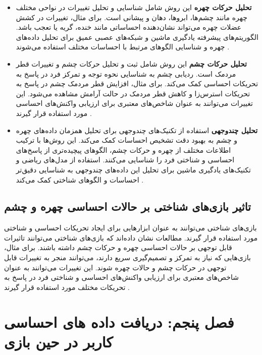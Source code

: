 \documentclass[12pt]{article}
\begin{document}
\begin{itemize}

\item \textbf{تحلیل حرکات چهره}  این روش شامل شناسایی و تحلیل تغییرات در نواحی مختلف چهره مانند چشم‌ها، ابروها، دهان و پیشانی است. برای مثال، تغییرات در کشش عضلات چهره می‌تواند نشان‌دهنده احساساتی مانند خنده، گریه یا تعجب باشد. الگوریتم‌های پیشرفته یادگیری ماشین و شبکه‌های عصبی عمیق برای تحلیل داده‌های چهره و شناسایی الگوهای مرتبط با احساسات مختلف استفاده می‌شوند \cite{Nweke2019}.

\item \textbf{تحلیل حرکات چشم}  این روش شامل ثبت و تحلیل حرکات چشم و تغییرات قطر مردمک است. ردیابی چشم به شناسایی نحوه توجه و تمرکز فرد در پاسخ به تحریکات احساسی کمک می‌کند. برای مثال، افزایش قطر مردمک چشم در پاسخ به تحریکات استرس‌زا و کاهش قطر مردمک در حالت آرامش مشاهده می‌شود. این تغییرات می‌توانند به عنوان شاخص‌های معتبری برای ارزیابی واکنش‌های احساسی مورد استفاده قرار گیرند \cite{Partala2003}.

\item \textbf{تحلیل چندوجهی}  استفاده از تکنیک‌های چندوجهی برای تحلیل همزمان داده‌های چهره و چشم به بهبود دقت تشخیص احساسات کمک می‌کند. این روش‌ها با ترکیب اطلاعات مختلف از چهره و حرکات چشم، الگوهای پیچیده‌تری از پاسخ‌های احساسی و شناختی فرد را شناسایی می‌کنند. استفاده از مدل‌های ریاضی و تکنیک‌های یادگیری ماشین برای تحلیل این داده‌های چندوجهی به شناسایی دقیق‌تر احساسات و الگوهای شناختی کمک می‌کند \cite{Zhao2019}.
\end{itemize}

\subsection{تاثیر بازی‌های شناختی بر حالات احساسی چهره و چشم}

بازی‌های شناختی می‌توانند به عنوان ابزارهایی برای ایجاد تحریکات احساسی و شناختی مورد استفاده قرار گیرند. مطالعات نشان داده‌اند که بازی‌های شناختی می‌توانند تاثیرات قابل توجهی بر حالات احساسی چهره و حرکات چشم داشته باشند. برای مثال، بازی‌هایی که نیاز به تمرکز و تصمیم‌گیری سریع دارند، می‌توانند منجر به تغییرات قابل توجهی در حرکات چشم و حالات چهره شوند. این تغییرات می‌توانند به عنوان شاخص‌های معتبری برای ارزیابی واکنش‌های احساسی و شناختی فرد در پاسخ به تحریکات مختلف مورد استفاده قرار گیرند \cite{Kunz2019}.

\section{فصل پنجم: دریافت داده های احساسی کاربر در حین بازی}
\end{document}
